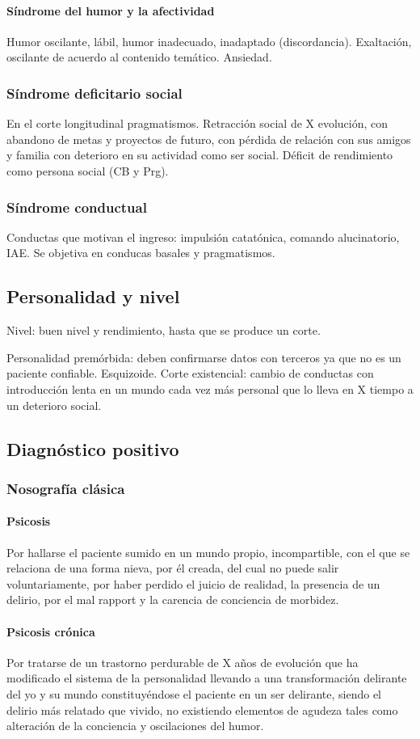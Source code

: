 \paragraph{Síndrome del humor y la afectividad}
Humor oscilante, lábil, humor inadecuado, inadaptado (discordancia). Exaltación, oscilante de acuerdo al contenido temático. Ansiedad.
\subsubsection*{Síndrome deficitario social}
En el corte longitudinal pragmatismos. Retracción social de X evolución, con abandono de metas y proyectos de futuro, con pérdida de relación con sus amigos y familia con deterioro en su actividad como ser social. Déficit de rendimiento como persona social (CB y Prg).
\subsubsection*{Síndrome conductual}
Conductas que motivan el ingreso: impulsión catatónica, comando alucinatorio, IAE. Se objetiva en conducas basales y pragmatismos.
\subsection*{Personalidad y nivel}
Nivel: buen nivel y rendimiento, hasta que se produce un corte.

Personalidad premórbida: deben confirmarse datos con terceros ya que no es un paciente confiable. Esquizoide. Corte existencial: cambio de conductas con introducción lenta en un mundo cada vez más personal que lo lleva en X tiempo a un deterioro social.
\subsection*{Diagnóstico positivo}
\subsubsection*{Nosografía clásica}
\paragraph*{Psicosis}
Por hallarse el paciente sumido en un mundo propio, incompartible, con el que se relaciona de una forma nieva, por él creada, del cual no puede salir voluntariamente, por haber perdido el juicio de realidad, la presencia de un delirio, por el mal rapport y la carencia de conciencia de morbidez.
\paragraph*{Psicosis crónica}
Por tratarse de un trastorno perdurable de X años de evolución que ha modificado el sistema de la personalidad llevando a una transformación delirante del yo y su mundo constituyéndose el paciente en un ser delirante, siendo el delirio más relatado que vivido, no existiendo elementos de agudeza tales como alteración de la conciencia y oscilaciones del humor.
